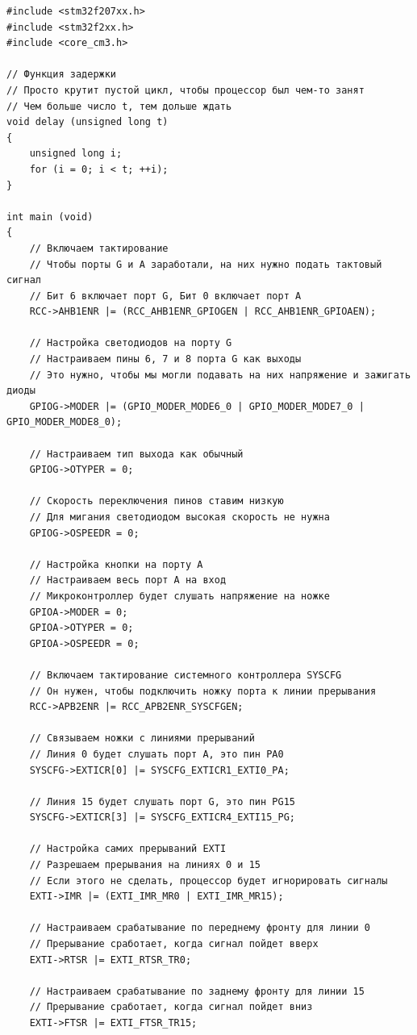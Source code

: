 \begin{lstlisting}[style=cstyle, caption={Основная функция программы}]
#include <stm32f207xx.h>
#include <stm32f2xx.h>
#include <core_cm3.h>

// Функция задержки
// Просто крутит пустой цикл, чтобы процессор был чем-то занят
// Чем больше число t, тем дольше ждать
void delay (unsigned long t)
{
    unsigned long i;
    for (i = 0; i < t; ++i);
}

int main (void)
{
    // Включаем тактирование
    // Чтобы порты G и A заработали, на них нужно подать тактовый сигнал
    // Бит 6 включает порт G, Бит 0 включает порт A
    RCC->AHB1ENR |= (RCC_AHB1ENR_GPIOGEN | RCC_AHB1ENR_GPIOAEN); 

    // Настройка светодиодов на порту G
    // Настраиваем пины 6, 7 и 8 порта G как выходы
    // Это нужно, чтобы мы могли подавать на них напряжение и зажигать диоды
    GPIOG->MODER |= (GPIO_MODER_MODE6_0 | GPIO_MODER_MODE7_0 | GPIO_MODER_MODE8_0);
    
    // Настраиваем тип выхода как обычный
    GPIOG->OTYPER = 0; 
    
    // Скорость переключения пинов ставим низкую
    // Для мигания светодиодом высокая скорость не нужна
    GPIOG->OSPEEDR = 0; 

    // Настройка кнопки на порту A
    // Настраиваем весь порт А на вход
    // Микроконтроллер будет слушать напряжение на ножке
    GPIOA->MODER = 0; 
    GPIOA->OTYPER = 0;
    GPIOA->OSPEEDR = 0;

    // Включаем тактирование системного контроллера SYSCFG
    // Он нужен, чтобы подключить ножку порта к линии прерывания
    RCC->APB2ENR |= RCC_APB2ENR_SYSCFGEN; 

    // Связываем ножки с линиями прерываний
    // Линия 0 будет слушать порт A, это пин PA0
    SYSCFG->EXTICR[0] |= SYSCFG_EXTICR1_EXTI0_PA; 
    
    // Линия 15 будет слушать порт G, это пин PG15
    SYSCFG->EXTICR[3] |= SYSCFG_EXTICR4_EXTI15_PG; 

    // Настройка самих прерываний EXTI
    // Разрешаем прерывания на линиях 0 и 15
    // Если этого не сделать, процессор будет игнорировать сигналы
    EXTI->IMR |= (EXTI_IMR_MR0 | EXTI_IMR_MR15);
    
    // Настраиваем срабатывание по переднему фронту для линии 0
    // Прерывание сработает, когда сигнал пойдет вверх
    EXTI->RTSR |= EXTI_RTSR_TR0; 
    
    // Настраиваем срабатывание по заднему фронту для линии 15
    // Прерывание сработает, когда сигнал пойдет вниз
    EXTI->FTSR |= EXTI_FTSR_TR15; 


\end{lstlisting}
